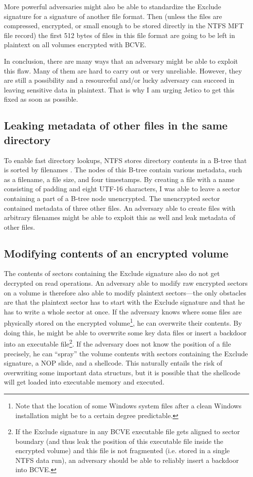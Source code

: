 \documentclass[11pt]{article}
\begin{document}
More powerful adversaries might also be able to standardize the Exclude signature for a signature of another file format. Then (unless the files are compressed, encrypted, or small enough to be stored directly in the NTFS MFT file record) the first 512 bytes of files in this file format are going to be left in plaintext on all volumes encrypted with BCVE.

In conclusion, there are many ways that an adversary might be able to exploit this flaw. Many of them are hard to carry out or very unreliable. However, they are still a possibility and a resourceful and/or lucky adversary can succeed in leaving sensitive data in plaintext. That is why I am urging Jetico to get this fixed as soon as possible.

\subsection{Leaking metadata of other files in the same directory}

To enable fast directory lookups, NTFS stores directory contents in a B-tree that is sorted by filenames \cite{russinovich}. The nodes of this B-tree contain various metadata, such as a filename, a file size, and four timestamps. By creating a file with a name consisting of padding and eight UTF-16 characters, I was able to leave a sector containing a part of a B-tree node unencrypted. The unencrypted sector contained metadata of three other files. An adversary able to create files with arbitrary filenames might be able to exploit this as well and leak metadata of other files.

\subsection{Modifying contents of an encrypted volume}

The contents of sectors containing the Exclude signature also do not get decrypted on read operations. An adversary able to modify raw encrypted sectors on a volume is therefore also able to modify plaintext sectors---the only obstacles are that the plaintext sector has to start with the Exclude signature and that he has to write a whole sector at once. If the adversary knows where some files are physically stored on the encrypted volume\footnote{Note that the location of some Windows system files after a clean Windows installation might be to a certain degree predictable.}, he can overwrite their contents. By doing this, he might be able to overwrite some key data files or insert a backdoor into an executable file\footnote{If the Exclude signature in any BCVE executable file gets aligned to sector boundary (and thus leak the position of this executable file inside the encrypted volume) and this file is not fragmented (i.e. stored in a single NTFS data run), an adversary should be able to reliably insert a backdoor into BCVE.}. If the adversary does not know the position of a file precisely, he can ``spray'' the volume contents with sectors containing the Exclude signature, a NOP slide, and a shellcode. This naturally entails the risk of overwriting some important data structurs, but it is possible that the shellcode will get loaded into executable memory and executed.
\end{document}

